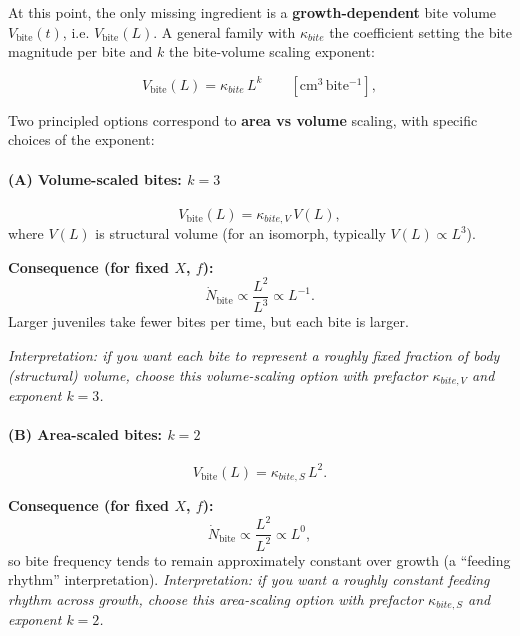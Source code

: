 \documentclass[11pt]{article}
\begin{document}
At this point, the only missing ingredient is a \textbf{growth-dependent} bite volume \(V_{\text{bite}}(t)\), i.e. \(V_{\text{bite}}(L)\). A general family with \(\kappa_{bite}\) the coefficient setting the bite magnitude per bite and \(k\) the bite-volume scaling exponent:

\begin{equation}
V_{\text{bite}}(L) = \kappa_{bite}\,L^{k}
\qquad [\mathrm{cm^3\,bite^{-1}}],
\end{equation}


Two principled options correspond to \textbf{area vs volume} scaling, with specific choices of the exponent:

\paragraph{(A) Volume-scaled bites: \(k=3\)}
\begin{equation}
V_{\text{bite}}(L)=\kappa_{bite,V}\,V(L),
\end{equation}
where \(V(L)\) is structural volume (for an isomorph, typically \(V(L)\propto L^3\)).

\textbf{Consequence (for fixed \(X\), \(f\)):}
\begin{equation}
\dot N_{\text{bite}} \propto \frac{L^2}{L^3} \propto L^{-1}.
\end{equation}
Larger juveniles take fewer bites per time, but each bite is larger.

\emph{Interpretation: if you want each bite to represent a roughly fixed fraction of body (structural) volume, choose this volume-scaling option with prefactor \(\kappa_{bite,V}\) and exponent \(k=3\).}

\paragraph{(B) Area-scaled bites: \(k=2\)}
\begin{equation}
V_{\text{bite}}(L)=\kappa_{bite,S}\,L^2.
\end{equation}

\textbf{Consequence (for fixed \(X\), \(f\)):}
\begin{equation}
\dot N_{\text{bite}} \propto \frac{L^2}{L^2} \propto L^{0},
\end{equation}
so bite frequency tends to remain approximately constant over growth (a ``feeding rhythm'' interpretation).
\emph{Interpretation: if you want a roughly constant feeding rhythm across growth, choose this area-scaling option with prefactor \(\kappa_{bite,S}\) and exponent \(k=2\).}
\newpage
\end{document}
